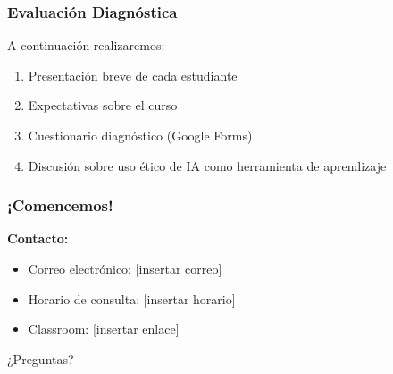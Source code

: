 \documentclass{beamer}
\begin{document}
\begin{frame}
    \frametitle{Evaluación Diagnóstica}
    
    A continuación realizaremos:
    \begin{enumerate}
        \item Presentación breve de cada estudiante
        \item Expectativas sobre el curso
        \item Cuestionario diagnóstico (Google Forms)
        \item Discusión sobre uso ético de IA como herramienta de aprendizaje
    \end{enumerate}
\end{frame}

\begin{frame}
    \frametitle{¡Comencemos!}
    
    \textbf{Contacto:}
    \begin{itemize}
        \item Correo electrónico: [insertar correo]
        \item Horario de consulta: [insertar horario]
        \item Classroom: [insertar enlace]
    \end{itemize}
    \vspace{0.8cm}
    
    \begin{center}
        \Large ¿Preguntas?
    \end{center}
\end{frame}
\end{document}
